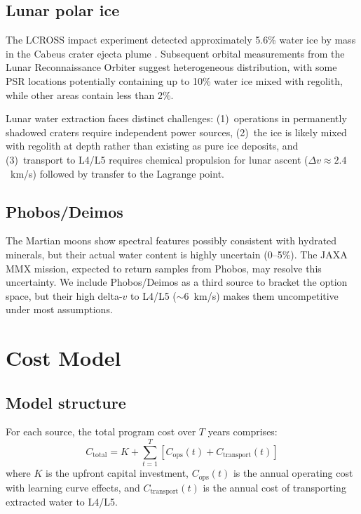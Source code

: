 \documentclass[preprint,12pt]{elsarticle}
\begin{document}
\subsection{Lunar polar ice}
\label{sec:lunar}

The LCROSS impact experiment detected approximately 5.6\% water ice by mass in the Cabeus crater ejecta plume \cite{colaprete2010}. Subsequent orbital measurements from the Lunar Reconnaissance Orbiter suggest heterogeneous distribution, with some PSR locations potentially containing up to 10\% water ice mixed with regolith, while other areas contain less than 2\%.

Lunar water extraction faces distinct challenges: (1)~operations in permanently shadowed craters require independent power sources, (2)~the ice is likely mixed with regolith at depth rather than existing as pure ice deposits, and (3)~transport to L4/L5 requires chemical propulsion for lunar ascent ($\Delta v \approx 2.4$~km/s) followed by transfer to the Lagrange point.

\subsection{Phobos/Deimos}
\label{sec:phobos}

The Martian moons show spectral features possibly consistent with hydrated minerals, but their actual water content is highly uncertain (0--5\%). The JAXA MMX mission, expected to return samples from Phobos, may resolve this uncertainty. We include Phobos/Deimos as a third source to bracket the option space, but their high delta-$v$ to L4/L5 ($\sim$6~km/s) makes them uncompetitive under most assumptions.

\section{Cost Model}
\label{sec:model}

\subsection{Model structure}

For each source, the total program cost over $T$ years comprises:
\begin{equation}
    C_\text{total} = K + \sum_{t=1}^{T} \left[ C_\text{ops}(t) + C_\text{transport}(t) \right]
    \label{eq:total-cost}
\end{equation}
where $K$ is the upfront capital investment, $C_\text{ops}(t)$ is the annual operating cost with learning curve effects, and $C_\text{transport}(t)$ is the annual cost of transporting extracted water to L4/L5.
\end{document}
